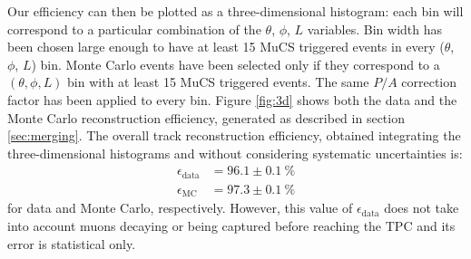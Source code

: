 \documentclass[a4paper]{scrartcl}
\begin{document}
Our efficiency can then be plotted as a three-dimensional histogram: each bin will correspond to a particular combination of the $\theta$, $\phi$, $L$ variables. Bin width has been chosen large enough to have at least 15 MuCS triggered events in every ($\theta$, $\phi$, $L$) bin. Monte Carlo events have been selected only if they correspond to a $(\theta,\phi,L)$ bin with at least 15 MuCS triggered events. The same $P/A$ correction factor has been applied to every bin. Figure \ref{fig:3d} shows both the data and the Monte Carlo reconstruction efficiency, generated as described in section \ref{sec:merging}. The overall track reconstruction efficiency, obtained integrating the three-dimensional histograms and without considering systematic uncertainties is:
\begin{align*}
\epsilon_{\mathrm{data}} &= 96.1 \pm 0.1~\%\\
\epsilon_{\mathrm{MC}} &= 97.3 \pm 0.1~\%
\end{align*} for data and Monte Carlo, respectively. However, this value of $\epsilon_{\mathrm{data}}$ does not take into account muons decaying or being captured before reaching the TPC and its error is statistical only.
\end{document}
